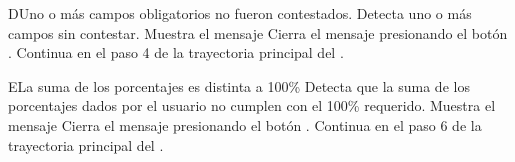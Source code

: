 
\begin{UCtrayectoriaA}{D}{Uno o más campos obligatorios no fueron contestados.}
    \UCpaso Detecta uno o más campos sin contestar.
    \UCpaso Muestra el mensaje 
    \UCpaso[\UCactor] Cierra el mensaje presionando el botón .
    \UCpaso Continua en el paso 4 de la trayectoria principal del .
\end{UCtrayectoriaA}



\begin{UCtrayectoriaA}{E}{La suma de los porcentajes es distinta a 100\%}
    \UCpaso Detecta que la suma de los porcentajes dados por el usuario no cumplen con el 100\% requerido.
    \UCpaso Muestra el mensaje 
    \UCpaso[\UCactor] Cierra el mensaje presionando el botón .
    \UCpaso Continua en el paso 6 de la trayectoria principal del .
\end{UCtrayectoriaA}


